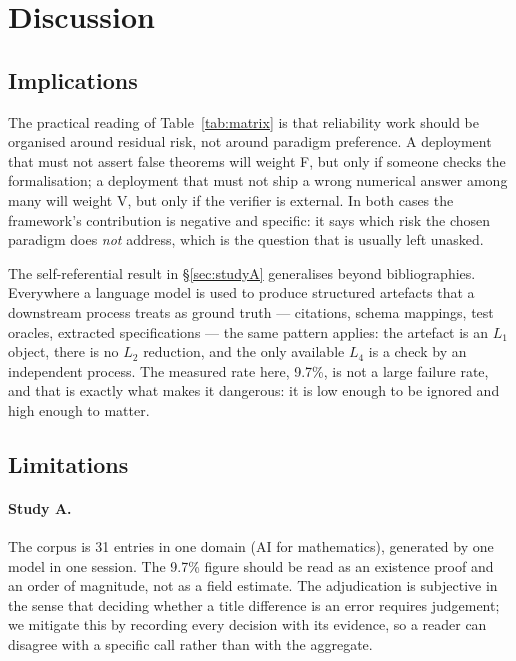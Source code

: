 \documentclass[11pt,a4paper]{article}
\newcommand{\paradigmV}{\textsf{V}}
\newcommand{\paradigmF}{\textsf{F}}
\begin{document}
\section{Discussion}

\subsection{Implications}

The practical reading of Table~\ref{tab:matrix} is that reliability work should
be organised around residual risk, not around paradigm preference. A deployment
that must not assert false theorems will weight \paradigmF{}, but only if
someone checks the formalisation; a deployment that must not ship a wrong
numerical answer among many will weight \paradigmV{}, but only if the verifier
is external. In both cases the framework's contribution is negative and
specific: it says which risk the chosen paradigm does \emph{not} address, which
is the question that is usually left unasked.

The self-referential result in \S\ref{sec:studyA} generalises beyond
bibliographies. Everywhere a language model is used to produce structured
artefacts that a downstream process treats as ground truth --- citations,
schema mappings, test oracles, extracted specifications --- the same pattern
applies: the artefact is an $L_1$ object, there is no $L_2$ reduction, and the
only available $L_4$ is a check by an independent process. The measured rate
here, 9.7\%, is not a large failure rate, and that is exactly what makes it
dangerous: it is low enough to be ignored and high enough to matter.

\subsection{Limitations}
\label{sec:limits}

\paragraph{Study A.} The corpus is 31 entries in one domain (AI for
mathematics), generated by one model in one session. The 9.7\% figure should be
read as an existence proof and an order of magnitude, not as a field estimate.
The adjudication is subjective in the sense that deciding whether a title
difference is an error requires judgement; we mitigate this by recording every
decision with its evidence, so a reader can disagree with a specific call
rather than with the aggregate.
\end{document}
